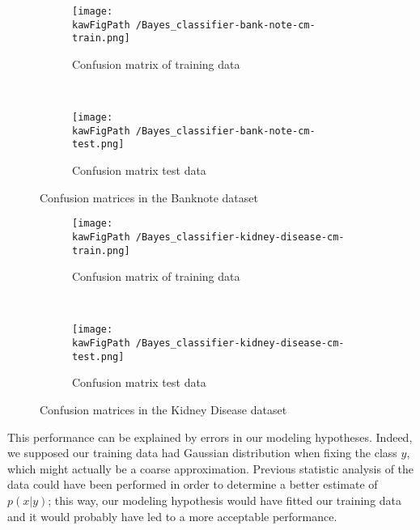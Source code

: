 \documentclass[11pt,a4paper]{article}
\def \kawFigPath {Output/Images}
\begin{document}
\begin{figure}[ht]
    \centering
    \begin{subfigure}[b]{0.45\textwidth} %
        \centering \texttt{[image: \\kawFigPath /Bayes\_classifier-bank-note-cm-train.png]}
        \caption{Confusion matrix of training data}\label{ligne_on}
    \end{subfigure}
    ~
    \begin{subfigure}[b]{0.45\textwidth}
        \centering \texttt{[image: \\kawFigPath /Bayes\_classifier-bank-note-cm-test.png]}
        \caption{Confusion matrix test data}\label{ligne_off}
    \end{subfigure}
    \caption{Confusion matrices in the Banknote dataset}\label{figxx}
\end{figure}
\begin{figure}[ht]
    \centering
    \begin{subfigure}[b]{0.45\textwidth} %
        \centering \texttt{[image: \\kawFigPath /Bayes\_classifier-kidney-disease-cm-train.png]}
        \caption{Confusion matrix of training data}\label{ligne_on}
    \end{subfigure}
    ~
    \begin{subfigure}[b]{0.45\textwidth}
        \centering \texttt{[image: \\kawFigPath /Bayes\_classifier-kidney-disease-cm-test.png]}
        \caption{Confusion matrix test data}\label{ligne_off}
    \end{subfigure}
    \caption{Confusion matrices in the Kidney Disease dataset}\label{figxx}
\end{figure}


This performance can be explained by errors in our modeling hypotheses. Indeed, we supposed our training data had Gaussian distribution when fixing the class $y$, which might actually be a coarse approximation. Previous statistic analysis of the data could have been performed in order to determine a better estimate of $p(x|y)$; this way, our modeling hypothesis would have fitted our training data and it would probably have led to a more acceptable performance. 
\end{document}
